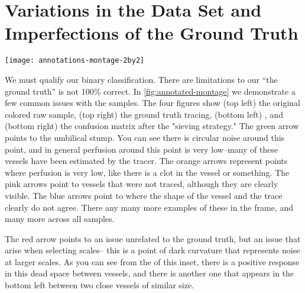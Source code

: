 
\section{Variations in the Data Set and Imperfections of the Ground Truth} \label{sec:NCS-dataset-issues}
\begin{sidewaysfigure}
	\texttt{[image: annotations-montage-2by2]}
	\caption{Issues with the ground truth manifesting in Frangi vesselness scores}
	\label{fig:annotated-montage}
\end{sidewaysfigure}

We must qualify our binary classification. There are limitations to our ``the ground truth'' is not 100\% correct. In \cref{fig:annotated-montage} we demonstrate a few common issues with the samples. The four figures show (top left) the original colored raw sample, (top right) the ground truth tracing, (bottom left) \Vmax, and (bottom right) the confusion matrix after the "sieving strategy."  The green arrow points to the umbilical stump. You can see there is circular noise around this point, and in general perfusion around this point is very low--many of these vessels have been estimated by the tracer. The orange arrows represent points where perfusion is very low, like there is a clot in the vessel or something. The pink arrows point to vessels that were not traced, although they are clearly visible. The blue arrows point to where the shape of the vessel and the trace clearly do not agree. There any many more examples of these in the frame, and many more across all samples.

The red arrow points to an issue unrelated to the ground truth, but an issue that arise when selecting scales-- this is a point of dark curvature that represents noise at larger scales. As you can see from the \Vmax of this inset, there is a positive response in this dead space between vessels, and there is another one that appears in the bottom left between two close vessels of similar size. 

